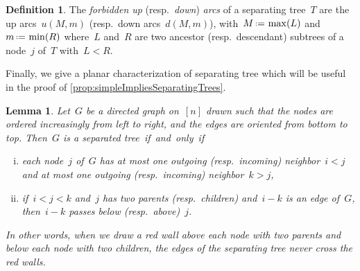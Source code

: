 \documentclass{amsart}
\newtheorem{corollary}[theorem]{Corollary}
\newtheorem{lemma}[theorem]{Lemma}
\theoremstyle{definition}
\newtheorem{definition}[theorem]{Definition}
\newcommand{\eqdef}{\mbox{\,\raisebox{0.2ex}{\scriptsize\ensuremath{\mathrm:}}\ensuremath{=}\,}} %
\newcommand{\darkblue}{\color{darkblue}} %
\newcommand{\defn}[1]{\textsl{\darkblue #1}} %
\begin{document}
\begin{definition}
\label{def:nonArcsSeparatingTree}
The \defn{forbidden up} (resp.~\defn{down}) \defn{arcs} of a separating tree~$T$ are the up arcs~$u(M, m)$ (resp.~down arcs~$d(M, m)$), with~$M \eqdef \max(L)$ and~$m \eqdef \min(R)$ where~$L$ and~$R$ are two ancestor (resp.~descendant) subtrees of a node~$j$ of~$T$ with~$L < R$.
\end{definition}



Finally, we give a planar characterization of separating tree which will be useful in the proof of \cref{prop:simpleImpliesSeparatingTrees}.

\begin{lemma}
\label{lem:separatingTree2}
Let~$G$ be a directed graph on~$[n]$ drawn such that the nodes are ordered increasingly from left to right, and the edges are oriented from bottom to top.
Then~$G$ is a separated tree~if~and~only~if
\begin{enumerate}[(i)]
\item each node~$j$ of~$G$ has at most one outgoing (resp.~incoming) neighbor~$i < j$ and at most one outgoing (resp.~incoming) neighbor~$k > j$,
\item if~$i < j < k$ and~$j$ has two parents (resp.~children) and~$i-k$ is an edge of~$G$, then~$i-k$ passes below (resp.~above)~$j$.
\end{enumerate}
In other words, when we draw a red wall above each node with two parents and below each node with two children, the edges of the separating tree never cross the red walls.
\end{lemma}
\end{document}
